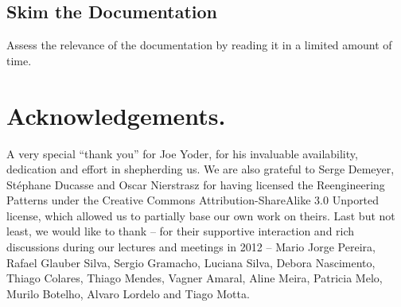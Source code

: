 \documentclass[12pt]{article}
\begin{document}
\subsection{\textbf{Skim the Documentation}} \label{involvement/SkimTheDocumentation}
    Assess the relevance of the documentation by reading it in a limited
    amount of time.


\section*{Acknowledgements.}
A very special ``thank you'' for  Joe Yoder, for his invaluable availability, dedication and effort in shepherding us.
We are also grateful to Serge Demeyer, St\'{e}phane Ducasse and Oscar Nierstrasz for having licensed the
Reengineering Patterns under the Creative Commons Attribution-ShareAlike 3.0 Unported license,
which allowed us to partially base our own work on theirs. 
Last but not least, we would like to thank -- 
for their supportive interaction and  rich discussions during our lectures and meetings in 2012 -- 
Mario Jorge Pereira, Rafael Glauber Silva, Sergio Gramacho, Luciana Silva, 
Debora Nascimento, Thiago Colares, Thiago Mendes, Vagner Amaral, 
Aline Meira, Patricia Melo, Murilo Botelho, Alvaro Lordelo and Tiago Motta.



\end{document}
